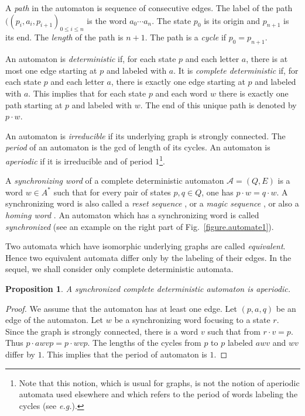 \documentclass[11pt,a4paper]{article}
\newtheorem{proposition}[theorem]{Proposition}
\def\A{\mathcal{A}}
\newcommand{\eg}{{\itshape e.g.}\xspace }
\begin{document}
A \emph{path} in the automaton is sequence of consecutive edges. The
label of the path $((p_i,a_i,p_{i+1})_{0 \leq i \leq n}$ is the word $a_0
  \dotsm a_{n}$. The state $p_0$ is its origin and $p_{n+1}$ is its end.
The \emph{length} of the path is $n+1$. The path is a \emph{cycle} if $p_0=p_{n+1}$.

An automaton is \emph{deterministic} if, for each state $p$ and each
letter $a$, there is at most one edge starting at $p$ and labeled with
$a$.  It is \emph{complete deterministic} if, for each state $p$ and
each letter $a$, there is exactly one edge starting at $p$ and
labeled with $a$.  This implies that for each state $p$ and each word
$w$ there is exactly one path starting at $p$ and labeled with $w$.
The end of this unique path is denoted by $p \cdot w$.

An automaton is \emph{irreducible} if its underlying graph is strongly
connected. The \emph{period} of an automaton is the gcd of length of
its cycles. An automaton is \emph{aperiodic} if it is
irreducible and of period $1$\footnote{Note that this notion, which is
  usual for graphs, is not the notion of aperiodic automata used
  elsewhere and which refers to the period of words labeling the
  cycles (see \eg \cite{Eilenberg76B}).}.

A \emph{synchronizing word} of a complete deterministic automaton
$\A=(Q,E)$ is a word $w \in A^*$ such that for every pair of states
$p,q \in Q$, one has $p \cdot w = q \cdot w$.  A synchronizing word is
also called a \emph{reset sequence} \cite{Eppstein1990}, or a
\emph{magic sequence} \cite{BoyleMass2000,BoyleMass2004}, or also a
\emph{homing word} \cite{PomeranzReddy1994}. An automaton which has a
synchronizing word is called \emph{synchronized} (see an example on
the right part of Fig.~\ref{figure.automate1}).

Two automata which have isomorphic underlying graphs are called
\emph{equivalent}. Hence two equivalent automata differ only by the
labeling of their edges. In the sequel, we shall consider only complete
deterministic automata.

\begin{proposition} A synchronized complete deterministic automaton is aperiodic.
\end{proposition}
\begin{proof}
We assume that the automaton has at least one edge.  Let $(p,a,q)$ be
an edge of the automaton.  Let $w$ be a synchronizing word focusing to
a state $r$.  Since the graph is strongly connected, there is a word
$v$ such that from $r \cdot v = p$. Thus $p \cdot awv p = p \cdot
wv p$.  The lengths of the cycles from $p$ to $p$ labeled $awv$ and
$wv$ differ by $1$.  This implies that the period of automaton is $1$.
\end{proof}
\end{document}
